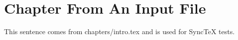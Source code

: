 \section{Chapter From An Input File}
This sentence comes from chapters/intro.tex and is used for SyncTeX tests.
